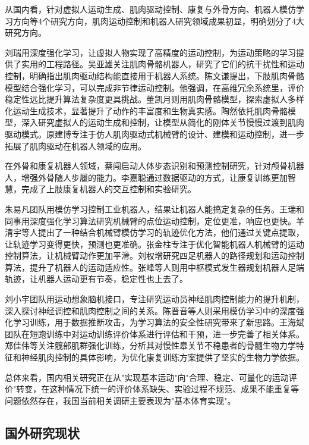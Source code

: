 从国内看，针对虚拟人运动生成、肌肉驱动控制、康复与外骨方向、机器人模仿学习方向等4个研究方向，肌肉运动控制和机器人研究领域成果初显，明确划分了4大研究方向。

刘瑞用深度强化学习，让虚拟人物实现了高精度的运动控制，为运动策略的学习提供了实用的工程路径\cite{ref01}。吴亚雄关注肌肉骨骼机器人，研究了它们的抗干扰性和运动控制，明确指出肌肉驱动结构能直接用于机器人系统\cite{ref02}。陈文谦提出，下肢肌肉骨骼模型结合强化学习，可以完成非节律运动控制。他强调，在高维冗余系统里，评价稳定性远比提升算法复杂度更具挑战\cite{ref03}。董凯月则用肌肉骨骼模型，探索虚拟人多样化运动生成技术，显著提升了动作的丰富度和生物真实感。陶然依托肌肉骨骼模型，深入研究虚拟人的运动生成和控制，让模型从简化的刚体关节慢慢过渡到肌肉驱动模式\cite{ref04}。原建博专注于仿人肌肉驱动式机械臂的设计、建模和运动控制，进一步拓展了肌肉驱动在机器人领域的应用\cite{ref06}。

在外骨和康复机器人领域，蔡闯启动人体步态识别和预测控制研究，针对颅骨机器人，增强外骨随人步履的能力\cite{ref07}。李嘉聪通过数据驱动的方式，让康复训练更加智慧\cite{ref08}，完成了上肢康复机器人的交互控制和实验研究。

朱易凡团队用模仿学习控制工业机器人，结果让机器人能搞定复杂的任务。王瑞和同事用深度强化学习算法研究机械臂的点位运动控制，定位更准，响应也更快。羊清宇等人提出了一种结合机械臂模仿学习的轨迹优化方法，他们通过关键点提取，让轨迹学习变得更快，预测也更准确。张金柱专注于优化智能机器人机械臂的运动控制算法，让机械臂动作更加平滑。刘权增研究四足机器人的路径规划和运动控制算法，提升了机器人的运动适应性。张峰等人则用中枢模式发生器规划机器人足端轨迹，让机器人运动更有节奏，稳定性也上去了。

刘小宇团队用运动想象脑机接口，专注研究运动员神经肌肉控制能力的提升机制，深入探讨神经调控和肌肉控制之间的关系\cite{ref15}。陈晋音等人则采用模仿学习中的深度强化学习训练，用于数据推断攻击，为学习算法的安全性研究带来了新思路\cite{ref16}。王海斌团队在短跑训练中对运动训练评价体系进行评估和干预，进一步完善了相关体系\cite{ref17}。郑佳伟等关注髋部肌群强化训练，分析其对慢性皋关节不稳患者的骨髓生物力学特征和神经肌肉控制的具体影响，为优化康复训练方案提供了坚实的生物力学依据\cite{ref18}。

总体来看，国内相关研究正在从"实现基本运动"向"合理、稳定、可量化的运动评价"转变，在这种情况下统一的评价体系缺失、实验过程不规范、成果不能重复等问题依然存在，我国当前相关调研主要表现为"基本体育实现"。

\subsection{国外研究现状}


